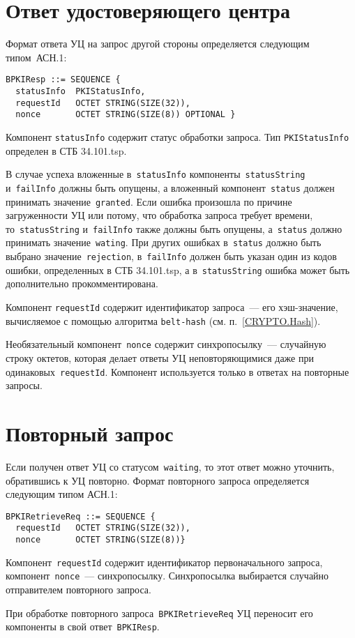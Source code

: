 \section{Ответ удостоверяющего центра}\label{FMT.BPKIResp}

Формат ответа УЦ на запрос другой стороны определяется следующим типом~АСН.1:
\begin{verbatim}
BPKIResp ::= SEQUENCE { 
  statusInfo  PKIStatusInfo,
  requestId   OCTET STRING(SIZE(32)),
  nonce       OCTET STRING(SIZE(8)) OPTIONAL }
\end{verbatim}

Компонент \texttt{statusInfo} содержит статус обработки запроса.
Тип \texttt{PKIStatusInfo} определен в СТБ 34.101.tsp. 

В случае успеха вложенные в~\texttt{statusInfo} 
компоненты~\texttt{statusString} 
и~\texttt{failInfo} должны быть опущены, а вложенный
компонент~\texttt{status} должен принимать значение~\texttt{granted}.
%
Если ошибка произошла по причине загруженности УЦ или потому, 
что обработка запроса требует времени, 
то~\texttt{statusString} и~\texttt{failInfo} также должны быть опущены, 
а~\texttt{status} должно принимать значение~\texttt{wating}.
%
При других ошибках в~\texttt{status} должно быть выбрано 
значение~\texttt{rejection}, в~\texttt{failInfo} должен быть указан один 
из кодов ошибки, определенных в СТБ 34.101.tsp, а в~\texttt{statusString} 
ошибка может быть дополнительно прокомментирована.

Компонент \texttt{requestId} содержит идентификатор запроса~--- 
его хэш-значение, вычисляемое с помощью алгоритма \texttt{belt-hash} 
(см. п.~\ref{CRYPTO.Hash}). 

Необязательный компонент~\texttt{nonce} содержит синхропосылку~---
случайную строку октетов, которая делает ответы УЦ неповторяющимися даже 
при одинаковых~\texttt{requestId}. Компонент используется только в ответах
на повторные запросы.

\section{Повторный запрос}\label{FMT.BPKIRetrieveReq}

Если получен ответ УЦ со статусом~\texttt{waiting}, то этот ответ можно 
уточнить, обратившись к УЦ повторно. Формат повторного запроса 
определяется следующим типом АСН.1:
\begin{verbatim}
BPKIRetrieveReq ::= SEQUENCE { 
  requestId   OCTET STRING(SIZE(32)),
  nonce       OCTET STRING(SIZE(8))}
\end{verbatim}

Компонент~\texttt{requestId} содержит идентификатор первоначального 
запроса, компонент~\texttt{nonce}~--- синхропосылку. Синхропосылка 
выбирается случайно отправителем повторного запроса. 

При обработке повторного запроса~\texttt{BPKIRetrieveReq} УЦ
переносит его компоненты в свой ответ~\texttt{BPKIResp}.

